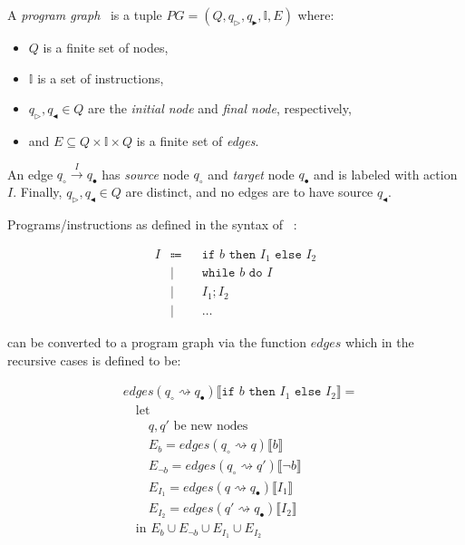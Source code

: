\begin{definition}
    A \emph{program graph}~\cite{nielson_formal_2019} is a tuple $PG = (Q, q_\vartriangleright, q_\blacktriangleright, \mathbb{I}, E)$ where:
    \begin{itemize}
        \item $Q$ is a finite set of nodes,
        \item $\mathbb{I}$ is a set of instructions,
        \item $q_\triangleright, q_\blacktriangleleft \in Q$ are the \emph{initial node} and \emph{final node}, respectively,
        \item and $E \subseteq Q \times \mathbb{I} \times Q$ is a finite set of \emph{edges}.
    \end{itemize}
    An edge $q_\circ \xrightarrow{I} q_\bullet$ has \emph{source} node $q_\circ$ and \emph{target} node $q_\bullet$ and is labeled with action $I$.
    Finally, $q_\triangleright, q_\blacktriangleleft \in Q$ are distinct, and no edges are to have source $q_\blacktriangleleft$.
\end{definition}

Programs/instructions as defined in the syntax of ~\cite{halder_abstract_2012}:

\begin{align*}
    I &\Coloneqq & &\texttt{if } b \texttt{ then } I_1 \texttt{ else } I_2 \\
    &\mid      & &\texttt{while } b \texttt{ do } I \\
    &\mid      & &I_1; I_2 \\
    &\mid      & &\dots
\end{align*}

can be converted to a program graph via the function $edges$ which in the recursive cases is defined to be:

\begin{equation}
    \begin{split}
        &edges(q_\circ \rightsquigarrow q_\bullet) \llbracket \texttt{if } b \texttt{ then } I_1 \texttt{ else } I_2 \rrbracket = \\
        &\quad \text{let } \\
        &\quad\quad q, q' \text{ be new nodes} \\
        &\quad\quad E_{b} = edges(q_\circ \rightsquigarrow q) \llbracket b \rrbracket \\
        &\quad\quad E_{\neg b} = edges(q_\circ \rightsquigarrow q') \llbracket \neg b \rrbracket \\
        &\quad\quad E_{I_1}= edges(q \rightsquigarrow q_\bullet) \llbracket I_1 \rrbracket \\
        &\quad\quad E_{I_2}= edges(q' \rightsquigarrow q_\bullet) \llbracket I_2 \rrbracket \\
        &\quad \text{in } E_{b} \cup E_{\neg b} \cup E_{I_1} \cup E_{I_2}
    \end{split}\label{eq:equation8}
\end{equation}

